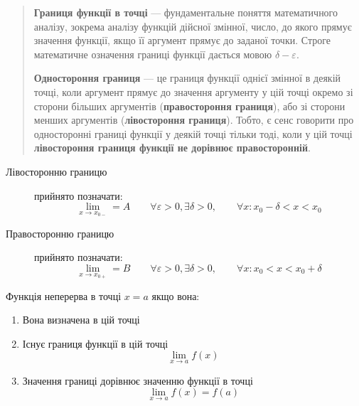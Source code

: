 \begin{center}\large{}\end{center}

\begin{quote}

\textbf{Границя функції в точці} — фундаментальне поняття математичного аналізу, зокрема аналізу функцій дійсної змінної, число, до якого прямує значення функції, якщо її аргумент прямує до заданої точки. Строге математичне означення границі функції дається мовою $\delta-\varepsilon$.

\textbf{Одностороння границя} — це границя функції однієї змінної в деякій точці, коли аргумент прямує до значення аргументу у цій точці окремо зі сторони більших аргументів (\textbf{правостороння границя}), або зі сторони менших аргументів (\textbf{лівостороння границя}). Тобто, є сенс говорити про односторонні границі функції у деякій точці тільки тоді, коли у цій точці \textbf{лівостороння границя функції не дорівнює правосторонній}.
\end{quote}


\begin{description}

  \item[Лівосторонню границю] прийнято позначати:
    \begin{displaymath} \lim_{x \to x_{0-}}=A \qquad
        \forall\varepsilon > 0, \exists \delta > 0, \qquad
        \forall{x}: x_0-\delta < x < x_0 \end{displaymath}

  \item[Правосторонню границю] прийнято позначати:
    \begin{displaymath} \lim_{x \to x_{0+}}=B \qquad
        \forall\varepsilon > 0, \exists \delta > 0, \qquad
        \forall{x}: x_0 < x < x_0 + \delta \end{displaymath}

\end{description}


Функція неперерва в точці $x=a$ якщо вона:
\begin{enumerate}
  \item Вона визначена в цій точці
  \item Існує границя функції в цій точці
    \begin{displaymath}\lim_{x \to a} f(x)\end{displaymath}
  \item Значення границі дорівнює значенню функції в точці
    \begin{displaymath}\lim_{x \to a} f(x) = f(a)\end{displaymath}
\end{enumerate}


